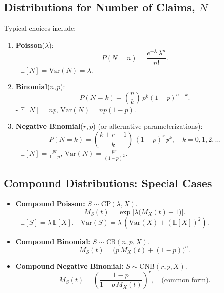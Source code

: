\documentclass[13pt,a4paper]{article}
\begin{document}
\subsection{Distributions for Number of Claims, \(N\)}
Typical choices include:
\begin{enumerate}
  \item \textbf{Poisson}(\(\lambda\)):
    \[
      P(N=n) = \frac{e^{-\lambda}\,\lambda^n}{n!}.
    \]
    - \(\mathbb{E}[N] = \mathrm{Var}(N)=\lambda\).
  \item \textbf{Binomial}(\(n,p\)):
    \[
      P(N=k) = \binom{n}{k}\,p^k(1-p)^{n-k}.
    \]
    - \(\mathbb{E}[N]=np, \,\mathrm{Var}(N)=np(1-p)\).
  \item \textbf{Negative Binomial}(\(r,p\)) (or alternative parameterizations):
    \[
      P(N=k) 
      = \binom{k+r-1}{k}\,(1-p)^r \,p^k, \quad k=0,1,2,\dots
    \]
    - \(\mathbb{E}[N]=\frac{pr}{1-p},\, \mathrm{Var}(N)=\frac{pr}{(1-p)^2}.\)
\end{enumerate}

\subsection{Compound Distributions: Special Cases}
\begin{itemize}
  \item \textbf{Compound Poisson:} \(S \sim \mathrm{CP}(\lambda, X)\). 
    \[
      M_S(t)=\exp\bigl[\lambda\bigl(M_X(t)-1\bigr)\bigr].
    \]
    - \(\mathbb{E}[S]=\lambda\,\mathbb{E}[X]\).
    - \(\mathrm{Var}(S)=\lambda\,(\mathrm{Var}(X)+(\mathbb{E}[X])^2)\).
  \item \textbf{Compound Binomial:} \(S \sim \mathrm{CB}(n,p,X)\). 
    \[
      M_S(t)=\bigl(p\,M_X(t) + (1-p)\bigr)^n.
    \]
  \item \textbf{Compound Negative Binomial:} \(S \sim \mathrm{CNB}(r,p,X)\).
    \[
      M_S(t)=\left(\frac{1-p}{1-p\,M_X(t)}\right)^r, \quad \text{(common form)}.
    \]
\end{itemize}
\end{document}
